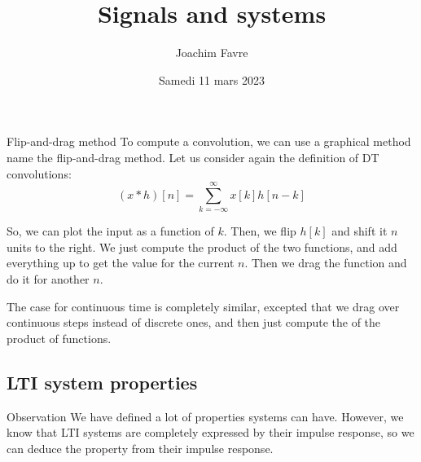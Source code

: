 \documentclass[a4paper]{article}
\title{Signals and systems}
\author{Joachim Favre}
\date{Samedi 11 mars 2023}
\begin{document}
\maketitle


\begin{parag}{Flip-and-drag method}
    To compute a convolution, we can use a graphical method name the flip-and-drag method. Let us consider again the definition of DT convolutions: 
    \[\left(x * h\right)\left[n\right] = \sum_{k=-\infty}^{\infty} x\left[k\right] h\left[n-k\right]\]
    
    So, we can plot the input as a function of $k$. Then, we flip $h\left[k\right]$ and shift it $n$ units to the right. We just compute the product of the two functions, and add everything up to get the value for the current $n$. Then we drag the function and do it for another $n$.

    The case for continuous time is completely similar, excepted that we drag over continuous steps instead of discrete ones, and then just compute the of the product of functions.
\end{parag}

\subsection{LTI system properties}

\begin{parag}{Observation}
    We have defined a lot of properties systems can have. However, we know that LTI systems are completely expressed by their impulse response, so we can deduce the property from their impulse response.
\end{parag}
\end{document}
